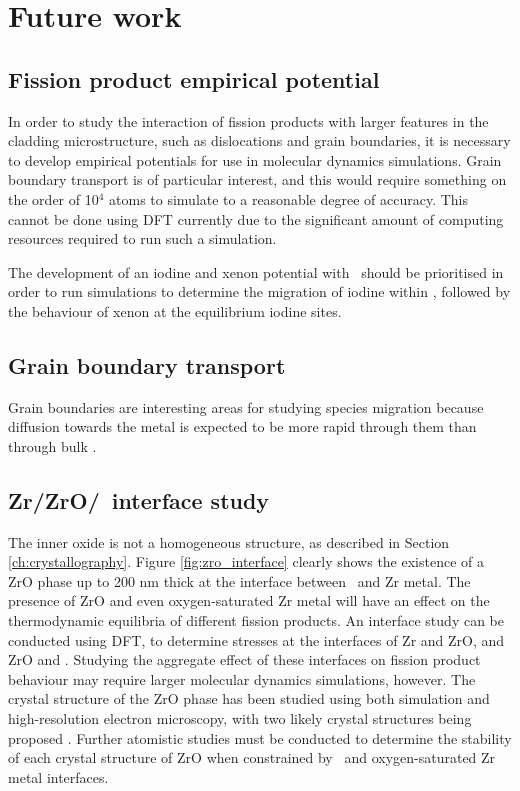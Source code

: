 \chapter{Future work}

\label{ch:future}

\section{Fission product empirical potential}

In order to study the interaction of fission products with larger features in the cladding microstructure, such as dislocations and grain boundaries, it is necessary to develop empirical potentials for use in molecular dynamics simulations. Grain boundary transport is of particular interest, and this would require something on the order of 10$^{4}$ atoms to simulate to a reasonable degree of accuracy. This cannot be done using DFT currently due to the significant amount of computing resources required to run such a simulation. 

The development of an iodine and xenon potential with \zirconia\ should be prioritised in order to run simulations to determine the migration of iodine within \zirconia, followed by the behaviour of xenon at the equilibrium iodine sites.

\section{Grain boundary transport}

Grain boundaries are interesting areas for studying species migration because diffusion towards the metal is expected to be more rapid through them than through bulk \zirconia .

\section{Zr/ZrO/\zirconia\ interface study}

The inner oxide is not a homogeneous structure, as described in Section \ref{ch:crystallography}. Figure \ref{fig:zro_interface} clearly shows the existence of a ZrO phase up to 200 nm thick at the interface between \zirconia\ and Zr metal. The presence of ZrO and even oxygen-saturated Zr metal will have an effect on the thermodynamic equilibria of different fission products. An interface study can be conducted using DFT, to determine stresses at the interfaces of Zr and ZrO, and ZrO and \zirconia . Studying the aggregate effect of these interfaces on fission product behaviour may require larger molecular dynamics simulations, however. The crystal structure of the ZrO phase has been studied using both simulation and high-resolution electron microscopy, with two likely crystal structures being proposed \cite{Nicholls2015}. Further atomistic studies must be conducted to determine the stability of each crystal structure of ZrO when constrained by \zirconia\ and oxygen-saturated Zr metal interfaces.


